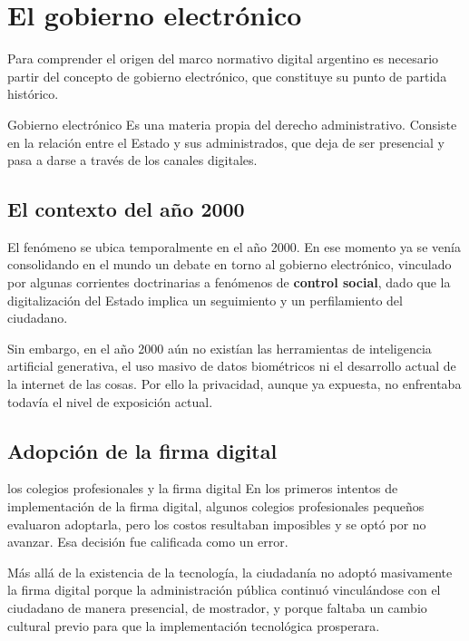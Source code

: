 \documentclass[12pt,oneside]{book}
\begin{document}
\section{El gobierno electrónico}

Para comprender el origen del marco normativo digital argentino es necesario partir del concepto de gobierno electrónico, que constituye su punto de partida histórico.

\begin{definition}{Gobierno electrónico}
Es una materia propia del derecho administrativo. Consiste en la relación entre el Estado y sus administrados, que deja de ser presencial y pasa a darse a través de los canales digitales.
\end{definition}


\subsection{El contexto del año 2000}

El fenómeno se ubica temporalmente en el año 2000. En ese momento ya se venía consolidando en el mundo un debate en torno al gobierno electrónico, vinculado por algunas corrientes doctrinarias a fenómenos de \textbf{control social}, dado que la digitalización del Estado implica un seguimiento y un perfilamiento del ciudadano.

Sin embargo, en el año 2000 aún no existían las herramientas de inteligencia artificial generativa, el uso masivo de datos biométricos ni el desarrollo actual de la internet de las cosas. Por ello la privacidad, aunque ya expuesta, no enfrentaba todavía el nivel de exposición actual.

\subsection{Adopción de la firma digital}

\begin{example}{los colegios profesionales y la firma digital}
En los primeros intentos de implementación de la firma digital, algunos colegios profesionales pequeños evaluaron adoptarla, pero los costos resultaban imposibles y se optó por no avanzar. Esa decisión fue calificada como un error.

Más allá de la existencia de la tecnología, la ciudadanía no adoptó masivamente la firma digital porque la administración pública continuó vinculándose con el ciudadano de manera presencial, de mostrador, y porque faltaba un cambio cultural previo para que la implementación tecnológica prosperara.
\end{example}
\end{document}
